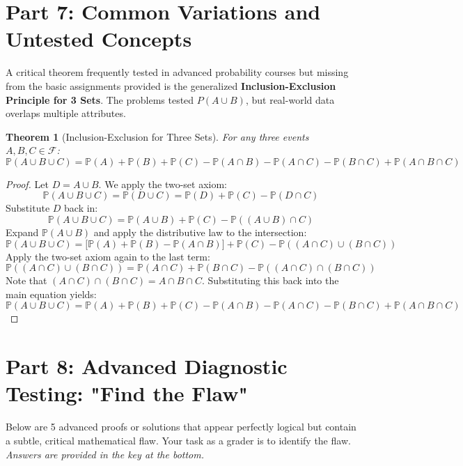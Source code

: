 \documentclass[11pt, letterpaper]{article}
\newtheorem{theorem}{Theorem}[section]
\theoremstyle{definition}
\theoremstyle{remark}
\newcommand{\Prob}{\mathbb{P}}
\begin{document}
\newpage
\section{Part 7: Common Variations and Untested Concepts}

A critical theorem frequently tested in advanced probability courses but missing from the basic assignments provided is the generalized \textbf{Inclusion-Exclusion Principle for 3 Sets}. The problems tested $P(A \cup B)$, but real-world data overlaps multiple attributes.

\begin{theorem}[Inclusion-Exclusion for Three Sets]
For any three events $A, B, C \in \mathscr{F}$:
\[ \Prob(A \cup B \cup C) = \Prob(A) + \Prob(B) + \Prob(C) - \Prob(A \cap B) - \Prob(A \cap C) - \Prob(B \cap C) + \Prob(A \cap B \cap C) \]
\end{theorem}

\begin{proof}
Let $D = A \cup B$. We apply the two-set axiom:
\[ \Prob(A \cup B \cup C) = \Prob(D \cup C) = \Prob(D) + \Prob(C) - \Prob(D \cap C) \]
Substitute $D$ back in:
\[ \Prob(A \cup B \cup C) = \Prob(A \cup B) + \Prob(C) - \Prob((A \cup B) \cap C) \]
Expand $\Prob(A \cup B)$ and apply the distributive law to the intersection:
\[ \Prob(A \cup B \cup C) = \big[ \Prob(A) + \Prob(B) - \Prob(A \cap B) \big] + \Prob(C) - \Prob((A \cap C) \cup (B \cap C)) \]
Apply the two-set axiom again to the last term:
\[ \Prob((A \cap C) \cup (B \cap C)) = \Prob(A \cap C) + \Prob(B \cap C) - \Prob((A \cap C) \cap (B \cap C)) \]
Note that $(A \cap C) \cap (B \cap C) = A \cap B \cap C$. Substituting this back into the main equation yields:
\[ \Prob(A \cup B \cup C) = \Prob(A) + \Prob(B) + \Prob(C) - \Prob(A \cap B) - \Prob(A \cap C) - \Prob(B \cap C) + \Prob(A \cap B \cap C) \]
\end{proof}


\section{Part 8: Advanced Diagnostic Testing: "Find the Flaw"}

Below are 5 advanced proofs or solutions that appear perfectly logical but contain a subtle, critical mathematical flaw. Your task as a grader is to identify the flaw. \textit{Answers are provided in the key at the bottom.}
\end{document}
